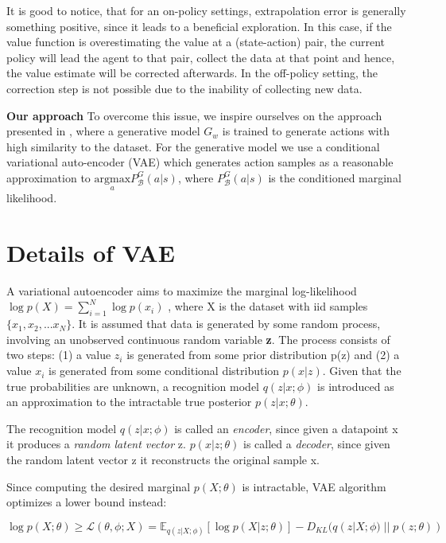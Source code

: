 It is good to notice, that for an on-policy settings, extrapolation error is generally something positive, since it
leads to a beneficial exploration. In this case, if the value function is overestimating the value at
a (state-action) pair, the current policy will lead the agent to that pair, collect the data at that point
and hence, the value estimate will be corrected afterwards.
In the off-policy setting, the correction step is not possible due to the inability of collecting new data.



\textbf{Our approach}
To overcome this issue, we inspire ourselves on the approach presented in \citet{Fujimoto2019}, where a
generative model $G_w$ is trained to generate actions with high similarity to the dataset.
For the generative model we use a conditional variational auto-encoder (VAE) \cite{Kingma2014} which
generates action samples as a reasonable approximation to
$\underset{a}{\text{argmax}}  P _\mathcal{B}^G(a|s)$, where $P _\mathcal{B}^G(a|s)$ is the 
conditioned marginal likelihood.

\section{Details of VAE}

A variational autoencoder aims to maximize the marginal log-likelihood $\log p(X) = \sum_{i=1}^{N}\log p(x_i)$
, where X is the dataset with iid samples $\{x_{1},x_2,...x_N\}$.
It is assumed that data is generated by some random process, involving an unobserved continuous
random variable \textbf{z}.
The process consists of two steps: (1) a value \textbf{$z_i$} is generated from some prior distribution p(z) and (2)
a value $x_i$ is generated from some conditional distribution $p(x|z)$.
Given that the true probabilities are unknown, a recognition model $q(z|x; \phi )$ is introduced
as an approximation to the intractable true posterior $p(z|x; \theta)$.

The recognition model $q(z|x; \phi)$ is called an \textit{encoder},  since given a datapoint x it produces
a \textit{random latent vector} z.
$p(x|z; \theta)$ is called a \textit{decoder},
since given the random latent vector z it reconstructs the original sample x.

Since computing the desired marginal $p(X; \theta)$ is intractable, VAE algorithm optimizes a lower bound instead:

\begin{equation}
    \log p(X; \theta) \geq \mathcal{L}(\theta, \phi; X) = \mathbb E_{q(z|X;\phi)} [\log p(X|z; \theta)] - D_{KL}(q(z|X;\phi)\; ||\;p(z; \theta))
\end{equation}

